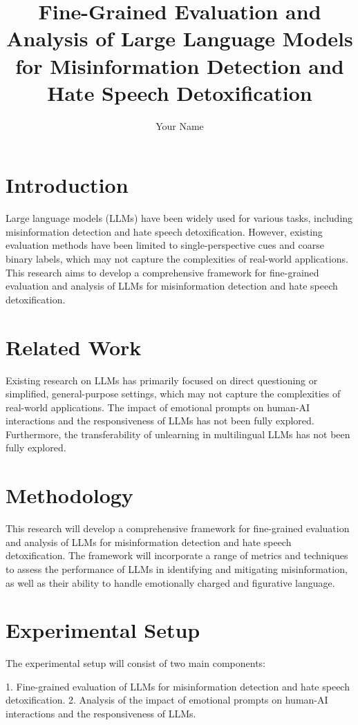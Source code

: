 \documentclass{article}
\title{Fine-Grained Evaluation and Analysis of Large Language Models for Misinformation Detection and Hate Speech Detoxification}
\author{Your Name}
\begin{document}
\maketitle

\section{Introduction}

Large language models (LLMs) have been widely used for various tasks, including misinformation detection and hate speech detoxification. However, existing evaluation methods have been limited to single-perspective cues and coarse binary labels, which may not capture the complexities of real-world applications. This research aims to develop a comprehensive framework for fine-grained evaluation and analysis of LLMs for misinformation detection and hate speech detoxification.

\section{Related Work}

Existing research on LLMs has primarily focused on direct questioning or simplified, general-purpose settings, which may not capture the complexities of real-world applications. The impact of emotional prompts on human-AI interactions and the responsiveness of LLMs has not been fully explored. Furthermore, the transferability of unlearning in multilingual LLMs has not been fully explored.

\section{Methodology}

This research will develop a comprehensive framework for fine-grained evaluation and analysis of LLMs for misinformation detection and hate speech detoxification. The framework will incorporate a range of metrics and techniques to assess the performance of LLMs in identifying and mitigating misinformation, as well as their ability to handle emotionally charged and figurative language.

\section{Experimental Setup}

The experimental setup will consist of two main components:

1.  Fine-grained evaluation of LLMs for misinformation detection and hate speech detoxification.
2.  Analysis of the impact of emotional prompts on human-AI interactions and the responsiveness of LLMs.
\end{document}
